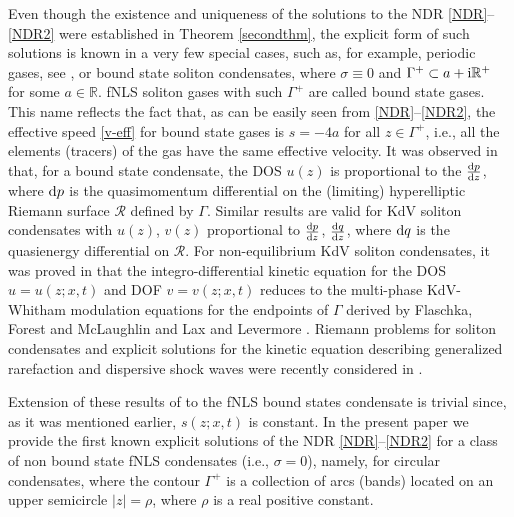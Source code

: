 \documentclass[10pt,a4paper]{amsart}
\numberwithin{equation}{section}
\newcommand{\G}{\Gamma}
\def\Rscr{\mathcal{R}}
\def\R{{\mathbb R}}
\def\s{ {\sigma}}
\def\s{\sigma}
\def\G{\Gamma}
\begin{document}
Even though the existence and uniqueness of the solutions to the NDR \eqref{NDR}--\eqref{NDR2} were established in Theorem \ref{secondthm}, the explicit form of such solutions is known in a very few special cases, such as, for example, periodic gases, see \cite{TW}, or bound state soliton condensates, where $\s\equiv 0$ and $\G^+\subset a+{\rm i}\R^+$ for some $a\in\R$. fNLS soliton gases with such $\G^+$ are called bound state gases. This name reflects the fact that, as can be easily seen from \eqref{NDR}--\eqref{NDR2}, the effective speed
\eqref{v-eff}
for bound state gases is $s=-4 a$ for all $z\in\G^+$, i.e., all the elements (tracers) of the gas have the same effective velocity. It was observed in \cite{KT2021} that, for a bound state condensate, the DOS $u(z)$ is proportional to the $\frac{{\rm d}p}{{\rm d}z}$, where ${\rm d}p$ is the quasimomentum differential on the (limiting) hyperelliptic Riemann surface $\Rscr$ defined by $\G$. Similar results are valid for KdV soliton condensates with $u(z)$, $v(z)$ proportional to $\frac{{\rm d}p}{{\rm d}z}$, $\frac{{\rm d}q}{{\rm d}z}$, where ${\rm d}q$ is the quasienergy differential on $\Rscr$. For non-equilibrium KdV soliton condensates, it was proved in \cite{CERT} that the integro-differential kinetic equation for
the DOS $u=u(z;x,t)$ and DOF $v=v(z;x,t)$
reduces to the multi-phase KdV-Whitham modulation equations for the endpoints of $\G$ derived by
Flaschka, Forest and McLaughlin \cite{FFM} and Lax and Levermore \cite{LL83}.
Riemann problems for soliton condensates and explicit solutions for
the kinetic equation describing generalized rarefaction and dispersive shock waves were recently considered in \cite{CERT}.

Extension of these results of \cite{CERT} to the fNLS bound states condensate is trivial since, as it was mentioned earlier, $s(z;x,t)$ is constant. In the
present paper we provide the first known explicit solutions of the NDR \eqref{NDR}--\eqref{NDR2} for a
class of
non bound state fNLS condensates (i.e., $\s=0$), namely, for circular condensates, where the contour $\G^+$ is a collection of arcs (bands) located on an upper semicircle $|z|=\rho$, where $\rho$ is a real positive constant.
\end{document}
